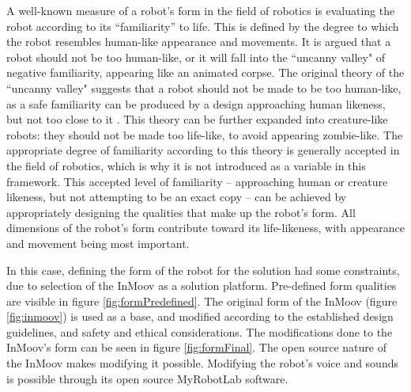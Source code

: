 A well-known measure of a robot's form in the field of robotics is evaluating the robot according to its ``familiarity'' to life. This is defined by the degree to which the robot resembles human-like appearance and movements. It is argued that a robot should not be too human-like, or it will fall into the ``uncanny valley" of negative familiarity, appearing like an animated corpse. The original theory of the ``uncanny valley" suggests that a robot should not be made to be too human-like, as a safe familiarity can be produced by a design approaching human likeness, but not too close to it \cite{mori1970uncanny}. This theory can be further expanded into creature-like robots: they should not be made too life-like, to avoid appearing zombie-like. The appropriate degree of familiarity according to this theory is generally accepted in the field of robotics, which is why it is not introduced as a variable in this framework. This accepted level of familiarity – approaching human or creature likeness, but not attempting to be an exact copy – can be achieved by appropriately designing the qualities that make up the robot's form. All dimensions of the robot's form contribute toward its life-likeness, with appearance and movement being most important.

In this case, defining the form of the robot for the solution had some constraints, due to selection of the InMoov as a solution platform. Pre-defined form qualities are visible in figure \ref{fig:formPredefined}. The original form of the InMoov (figure \ref{fig:inmoov}) is used as a base, and modified according to the established design guidelines, and safety and ethical considerations. The modifications done to the InMoov's form can be seen in figure \ref{fig:formFinal}. The open source nature of the InMoov makes modifying it possible. Modifying the robot's voice and sounds is possible through its open source MyRobotLab software.



